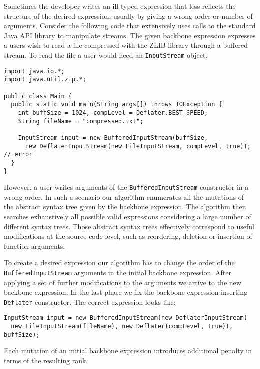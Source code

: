 Sometimes the developer writes an ill-typed expression that less reflects
the structure of the desired expression, usually by giving a wrong order
or number of arguments. Consider the following code that extensively uses
calls to the standard Java API library to manipulate streams.
The given backbone expression expresses a users wish to read a file 
compressed with the ZLIB library through a buffered stream.
To read the file a user would need an \lstinline{InputStream} object.
\begin{lstlisting}
import java.io.*;
import java.util.zip.*;

public class Main {
  public static void main(String args[]) throws IOException {
    int buffSize = 1024, compLevel = Deflater.BEST_SPEED;
    String fileName = "compressed.txt";
    
    InputStream input = new BufferedInputStream(buffSize,
      new DeflaterInputStream(new FileInputStream, compLevel, true)); // error
  }
}
\end{lstlisting}

However, a user writes arguments of the \lstinline{BufferedInputStream} constructor in a wrong order.
In such a scenario our algorithm enumerates all the mutations of the abstract syntax
tree given by the backbone expression. The algorithm then searches exhaustively
all possible valid expressions considering a large number of different syntax trees.
Those abstract syntax trees effectively correspond to useful modifications
at the source code level, such as reordering, deletion or insertion of function arguments.

To create a desired expression our algorithm has to change the order of
the \lstinline{BufferedInputStream} arguments in the initial backbone expression.
After applying a set of further modifications to the arguments we arrive to 
the new backbone expression. In the last phase we fix the backbone expression
inserting \lstinline{Deflater} constructor. The correct expression looks like:
\begin{lstlisting}    
InputStream input = new BufferedInputStream(new DeflaterInputStream(
  new FileInputStream(fileName), new Deflater(compLevel, true)), buffSize);
\end{lstlisting}
Each mutation of an initial backbone expression introduces additional penalty 
in terms of the resulting rank.
%
